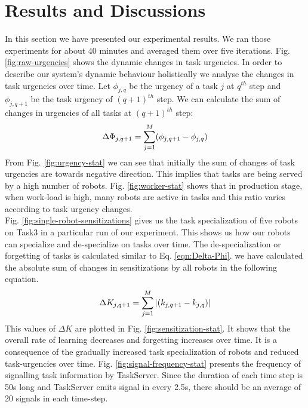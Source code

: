 \documentclass{llncs}
\begin{document}
\section{Results and Discussions}
\label{sec:results}
In this section we have presented our experimental results. We ran those experiments for about 40 minutes and averaged them over five iterations.
Fig. \ref{fig:raw-urgencies} shows the dynamic changes in task urgencies.  In order to describe our system's dynamic behaviour holistically we analyse the changes in task urgencies over time. Let $ \phi_{j, q}$ be the urgency of a task $j$ at $q^{th}$ step and $\phi_{j, q+1}$ be the task urgency of $(q+1)^{th}$ step. We can calculate the sum of changes in urgencies of all tasks at $(q+1)^{th}$ step:
\begin{equation} 
\small
\Delta \Phi_{j, q+1} = \sum_{j=1}^{M} (\phi_{j, q+1} - \phi_{j, q})
\label{eqn:Delta-Phi}
\end{equation}
From Fig. \ref{fig:urgency-stat} we can see that initially the sum of changes of task urgencies are towards negative direction. This implies that tasks are being served by a high number of robots. Fig. \ref{fig:worker-stat} shows that in production stage, when  work-load is high, many robots are active in tasks and this ratio varies according to task urgency changes.\\ 
Fig. \ref{fig:single-robot-sensitizations} gives us the task specialization of five robots on Task3 in a particular run of our experiment. This shows us how our robots can specialize and de-specialize on tasks over time. The de-specialization or forgetting of tasks is calculated similar to Eq. \ref{eqn:Delta-Phi}. we have calculated the absolute sum of changes in sensitizations by all robots in the following equation.
% 
\begin{equation}
\small 
\Delta K_{j, q+1} = \sum_{j=1}^{M} \left | (k_{j, q+1} - k_{j, q}) \right |
\label{eqn:Delta-K}
\end{equation}
This values of $\Delta K$ are plotted in Fig. \ref{fig:sensitization-stat}. It shows that the overall rate of learning decreases and forgetting increases over time. It is a consequence of the gradually increased task specialization of robots and reduced task-urgencies over time.
Fig. \ref{fig:signal-frequency-stat} presents the frequency of signalling task information by TaskServer. Since the duration of each time step is 50s long and TaskServer emits signal in every 2.5s, there should be an average of 20 signals in each time-step.\\
\end{document}
